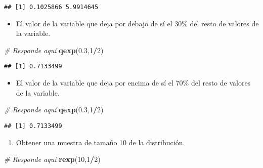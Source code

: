 \documentclass[
]{article}
\newenvironment{Shaded}{\begin{snugshade}}{\end{snugshade}}
\newcommand{\CommentTok}[1]{\textcolor[rgb]{0.56,0.35,0.01}{\textit{#1}}}
\newcommand{\DecValTok}[1]{\textcolor[rgb]{0.00,0.00,0.81}{#1}}
\newcommand{\FloatTok}[1]{\textcolor[rgb]{0.00,0.00,0.81}{#1}}
\newcommand{\KeywordTok}[1]{\textcolor[rgb]{0.13,0.29,0.53}{\textbf{#1}}}
\newcommand{\NormalTok}[1]{#1}
\newcommand{\OperatorTok}[1]{\textcolor[rgb]{0.81,0.36,0.00}{\textbf{#1}}}
\providecommand{\tightlist}{%
  \setlength{\itemsep}{0pt}\setlength{\parskip}{0pt}}
\begin{document}
\begin{verbatim}
## [1] 0.1025866 5.9914645
\end{verbatim}

\begin{itemize}
\tightlist
\item
  El valor de la variable que deja por debajo de sí el 30\% del resto de
  valores de la variable.
\end{itemize}

\begin{Shaded}
\begin{Highlighting}[]
\CommentTok{# Responde aquí}
\KeywordTok{qexp}\NormalTok{(}\FloatTok{0.3}\NormalTok{,}\DecValTok{1}\OperatorTok{/}\DecValTok{2}\NormalTok{)}
\end{Highlighting}
\end{Shaded}

\begin{verbatim}
## [1] 0.7133499
\end{verbatim}

\begin{itemize}
\tightlist
\item
  El valor de la variable que deja por encima de sí el 70\% del resto de
  valores de la variable.
\end{itemize}

\begin{Shaded}
\begin{Highlighting}[]
\CommentTok{# Responde aquí}
\KeywordTok{qexp}\NormalTok{(}\FloatTok{0.3}\NormalTok{,}\DecValTok{1}\OperatorTok{/}\DecValTok{2}\NormalTok{)}
\end{Highlighting}
\end{Shaded}

\begin{verbatim}
## [1] 0.7133499
\end{verbatim}

\begin{enumerate}
\def\labelenumi{\arabic{enumi}.}
\setcounter{enumi}{2}
\tightlist
\item
  Obtener una muestra de tamaño 10 de la distribución.
\end{enumerate}

\begin{Shaded}
\begin{Highlighting}[]
\CommentTok{# Responde aquí}
\KeywordTok{rexp}\NormalTok{(}\DecValTok{10}\NormalTok{,}\DecValTok{1}\OperatorTok{/}\DecValTok{2}\NormalTok{)}
\end{Highlighting}
\end{Shaded}
\end{document}
